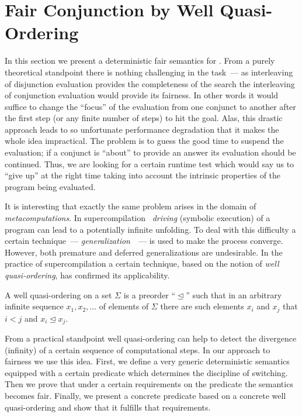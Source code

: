 
\section{Fair Conjunction by Well Quasi-Ordering}
\label{sec:fair-semantics}

In this section we present a deterministic fair semantics for \mk. From a purely theoretical standpoint there is nothing challenging in the task~--- 
as interleaving of disjunction evaluation provides the completeness of the search the interleaving of conjunction evaluation would provide its fairness. In other words it
would suffice to change the ``focus'' of the evaluation from one conjunct to another after the first step (or any finite number of steps) to hit the goal. Alas,
this drastic approach leads to so unfortunate performance degradation that it makes the whole idea impractical. The problem is to guess the good time to suspend the
evaluation; if a conjunct is ``about'' to provide an answer its evaluation should be continued. Thus, we are looking for a certain runtime test which would say
us to ``give up'' at the right time taking into account the intrinsic properties of the program being evaluated.

It is interesting that exactly the same problem arises in the domain of \emph{metacomputations}. In supercompilation~\cite{Turchin}
\emph{driving} (symbolic execution) of a program can lead to a potentially infinite unfolding. To deal with this difficulty a certain technique~---
\emph{generalization}~\cite{Sorensen95analgorithm}~--- is used to make the process converge. However, both premature and deferred generalizations are undesirable.
In the practice of supercompilation a certain technique, based on the notion of \emph{well quasi-ordering}, has confirmed its applicability.

\begin{definition}
  A well quasi-ordering on a set $\Sigma$ is a preorder ``$\trianglelefteq$'' such that in an arbitrary infinite sequence $x_1,x_2,\dots$ of elements
  of $\Sigma$ there are such elements $x_i$ and $x_j$ that $i<j$ and $x_i\trianglelefteq x_j$.
\end{definition}

From a practical standpoint well quasi-ordering can help to detect the divergence (infinity) of a certain sequence of computational steps. In our approach
to fairness we use this idea. First, we define a very generic deterministic semantics equipped with a certain predicate which determines the discipline of
switching. Then we prove that under a certain requirements on the predicate the semantics becomes fair. Finally, we present a concrete predicate based on
a concrete well quasi-ordering and show that it fulfills that requirements.

